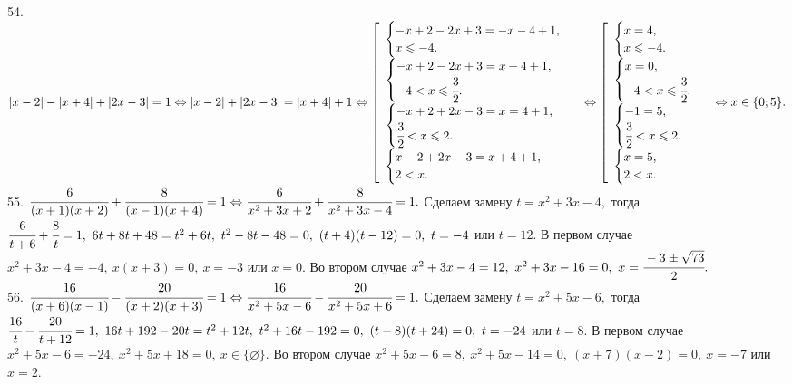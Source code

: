 \documentclass[12pt]{article}
\begin{document}
54. $|x-2|-|x+4|+|2x-3|=1\Leftrightarrow|x-2|+|2x-3|=|x+4|+1\Leftrightarrow \left[\begin{array}{l}\begin{cases} -x+2-2x+3=-x-4+1,\\ x\leqslant-4.\end{cases}\\
\begin{cases} -x+2-2x+3=x+4+1,\\ -4<x\leqslant\cfrac{3}{2}.\end{cases}\\ \begin{cases} -x+2+2x-3=x=4+1,\\ \cfrac{3}{2}<x\leqslant2.\end{cases}\\
\begin{cases} x-2+2x-3=x+4+1,\\ 2<x.\end{cases}\end{array}\right.\Leftrightarrow \left[\begin{array}{l}\begin{cases} x=4,\\ x\leqslant-4.\end{cases}\\
\begin{cases} x=0,\\ -4<x\leqslant\cfrac{3}{2}.\end{cases}\\ \begin{cases} -1=5,\\ \cfrac{3}{2}<x\leqslant2.\end{cases}\\
\begin{cases} x=5,\\ 2< x.\end{cases}\end{array}\right.\Leftrightarrow x\in\{0; 5\}.$\\
55. $\cfrac{6}{(x+1)(x+2)}+\cfrac{8}{(x-1)(x+4)}=1\Leftrightarrow \cfrac{6}{x^2+3x+2}+\cfrac{8}{x^2+3x-4}=1.$ Сделаем замену $t=x^2+3x-4,$ тогда $\cfrac{6}{t+6}+\cfrac{8}{t}=1,\ 6t+8t+48=t^2+6t,\ t^2-8t-48=0,\ (t+4)(t-12)=0,\ t=-4$ или $t=12.$ В первом случае $x^2+3x-4=-4,\ x(x+3)=0,\ x=-3$ или $x=0.$ Во втором случае $x^2+3x-4=12,\ x^2+3x-16=0,\ x=\cfrac{-3\pm\sqrt{73}}{2}.$\\
56. $\cfrac{16}{(x+6)(x-1)}-\cfrac{20}{(x+2)(x+3)}=1\Leftrightarrow\cfrac{16}{x^2+5x-6}-\cfrac{20}{x^2+5x+6}=1.$ Сделаем замену $t=x^2+5x-6,$ тогда $\cfrac{16}{t}-\cfrac{20}{t+12}=1,\ 16t+192-20t=t^2+12t,\ t^2+16t-192=0,\ (t-8)(t+24)=0,\ t=-24$ или $t=8.$ В первом случае $x^2+5x-6=-24,\ x^2+5x+18=0,\ x\in\{\varnothing\}.$ Во втором случае $x^2+5x-6=8,\ x^2+5x-14=0,\ (x+7)(x-2)=0,\ x=-7$ или $x=2.$\\
\end{document}
